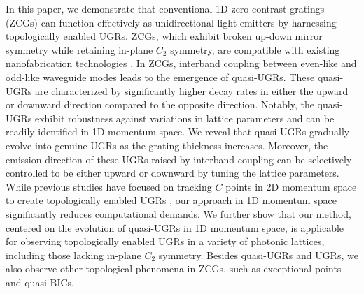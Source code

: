 \documentclass[%
 reprint,
superscriptaddress,
 amsmath,amssymb, aps,
]{revtex4-1}
\begin{document}
In this paper, we demonstrate that conventional 1D zero-contrast gratings (ZCGs) can function effectively as unidirectional light emitters by harnessing topologically enabled UGRs. ZCGs, which exhibit broken up-down mirror symmetry while retaining in-plane $C_2$ symmetry, are compatible with existing nanofabrication technologies \cite{Magnusson2014,MNiraula2015}. In ZCGs, interband coupling between even-like and odd-like waveguide modes leads to the emergence of quasi-UGRs. These quasi-UGRs are characterized by significantly higher decay rates in either the upward or downward direction compared to the opposite direction. Notably, the quasi-UGRs exhibit robustness against variations in lattice parameters and can be readily identified in 1D momentum space. We reveal that quasi-UGRs gradually evolve into genuine UGRs as the grating thickness increases. Moreover, the emission direction of these UGRs raised by interband coupling can be selectively controlled to be either upward or downward by tuning the lattice parameters. While previous studies have focused on tracking $C$ points in 2D momentum space to create topologically enabled UGRs \cite{XYin2020,YZeng2021}, our approach in 1D momentum space significantly reduces computational demands. We further show that our method, centered on the evolution of quasi-UGRs in 1D momentum space, is applicable for observing topologically enabled UGRs in a variety of photonic lattices, including those lacking in-plane $C_2$ symmetry. Besides quasi-UGRs and UGRs, we also observe other topological phenomena in ZCGs, such as exceptional points and quasi-BICs.
 
\end{document}
